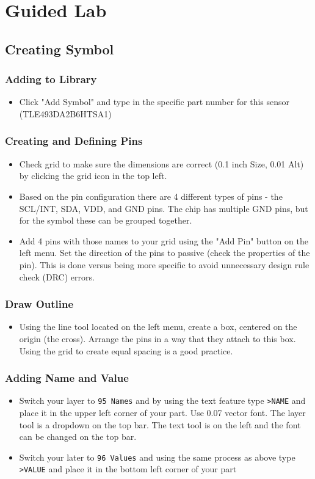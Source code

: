 \documentclass{article}
\begin{document}
\section{Guided Lab}
\subsection{Creating Symbol}
\subsubsection{Adding to Library}
\begin{itemize}
    \item Click "Add Symbol" and type in the specific part number for this sensor (TLE493DA2B6HTSA1)
\end{itemize}
\subsubsection{Creating and Defining Pins}
\begin{itemize}
    \item Check grid to make sure the dimensions are correct (0.1 inch Size, 0.01 Alt) by clicking the grid icon in the top left.
    \item Based on the pin configuration there are 4 different types of pins - the SCL/INT, SDA, VDD, and GND pins. The chip has multiple GND pins, but for the symbol these can be grouped together.
    \item Add 4 pins with those names to your grid using the "Add Pin" button on the left menu. Set the direction of the pins to passive (check the properties of the pin). This is done versus being more specific to avoid unnecessary design rule check (DRC) errors.
\end{itemize}
\subsubsection{Draw Outline}
\begin{itemize}
    \item Using the line tool located on the left menu, create a box, centered on the origin (the cross). Arrange the pins in a way that they attach to this box. Using the grid to create equal spacing is a good practice. 
\end{itemize}
\subsubsection{Adding Name and Value}
\begin{itemize}
    \item Switch your layer to \texttt{95 Names} and by using the text feature type \texttt{>NAME} and place it in the upper left corner of your part. Use 0.07 vector font. The layer tool is a dropdown on the top bar. The text tool is on the left and the font can be changed on the top bar.
    \item Switch your later to \texttt{96 Values} and using the same process as above type \texttt{>VALUE} and place it in the bottom left corner of your part
\end{itemize}
\end{document}
